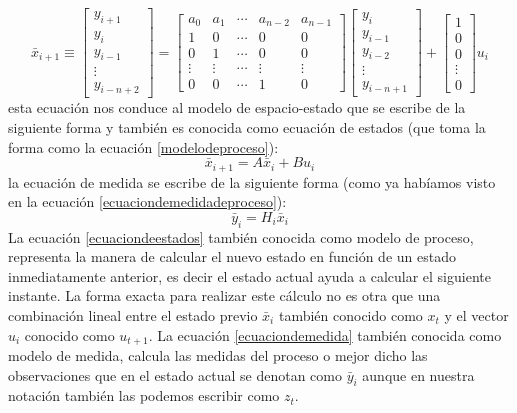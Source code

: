 \[
\bar{x}_{i+1} \equiv 
\begin{bmatrix}
    y_{i+1} \\
    y_{i}  \\
    y_{i-1} \\
    \vdots\\
    y_{i-n+2}
\end{bmatrix}
=
\begin{bmatrix}
    a_{0} & a_{1} & \cdots & a_{n-2} & a_{n-1} \\
    1 & 0 & \cdots & 0 & 0 \\
    0 & 1 & \cdots & 0 & 0 \\
    \vdots & \vdots & \cdots & \vdots & \vdots \\
    0 & 0 & \cdots & 1 & 0
\end{bmatrix}
\begin{bmatrix}
	y_{i} \\
    y_{i-1} \\
    y_{i-2} \\
    \vdots\\
    y_{i-n+1}
\end{bmatrix} 
+ 
\begin{bmatrix}
	1 \\
    0 \\
    0 \\
    \vdots\\
    0
\end{bmatrix}
u_{i}
\]
esta ecuación nos conduce al modelo de espacio-estado que se escribe de la siguiente forma y también es conocida como ecuación de estados (que toma la forma como la ecuación \ref{modelodeproceso}):
\begin{equation}\label{ecuaciondeestados}
\bar{x}_{i+1} = A\bar{x}_{i} + B u_{i}
\end{equation}
la ecuación de medida se escribe de la siguiente forma (como ya habíamos visto en la ecuación \ref{ecuaciondemedidadeproceso}):
\begin{equation}\label{ecuaciondemedida}
\bar{y}_{i} = H_{i}\bar{x}_{i}
\end{equation}
La ecuación \ref{ecuaciondeestados} también conocida como modelo de proceso, representa la manera de calcular el nuevo estado en función de un estado inmediatamente anterior, es decir el estado actual ayuda a calcular el siguiente instante. 
La forma exacta para realizar este cálculo no es otra que una combinación lineal entre el estado previo $\bar{x}_{i}$ también conocido como $x_{t}$ y el vector $u_{i}$ conocido como $u_{t+1}$. 
La ecuación \ref{ecuaciondemedida} también conocida como modelo de medida, calcula las medidas del proceso o mejor dicho las observaciones que en el estado actual se denotan como $\bar{y}_{i}$ aunque en nuestra notación también las podemos escribir como $z_{t}$. 
